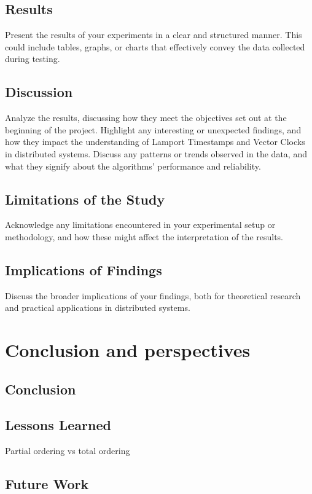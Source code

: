 \documentclass{article}
\begin{document}
   
  \subsection{Results}

    Present the results of your experiments in a clear and structured manner. This could include tables, graphs, or charts that effectively convey the data collected during testing.

  \subsection{Discussion}

    Analyze the results, discussing how they meet the objectives set out at the beginning of the project. Highlight any interesting or unexpected findings, and how they impact the understanding of Lamport Timestamps and Vector Clocks in distributed systems. Discuss any patterns or trends observed in the data, and what they signify about the algorithms' performance and reliability.

  \subsection{Limitations of the Study}

    Acknowledge any limitations encountered in your experimental setup or methodology, and how these might affect the interpretation of the results.

  \subsection{Implications of Findings}

    Discuss the broader implications of your findings, both for theoretical research and practical applications in distributed systems.

\section{Conclusion and perspectives}
    \subsection{Conclusion}
    
    \subsection{Lessons Learned}
      Partial ordering vs total ordering

    \subsection{Future Work}

\newpage
    \nocite{*}
\end{document}
